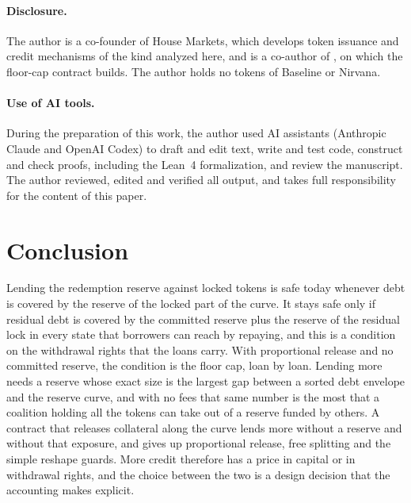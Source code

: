 \paragraph{Disclosure.} The author is a co-founder of House Markets, which develops token issuance and credit mechanisms of the kind analyzed here, and is a co-author of \vone, on which the floor-cap contract builds. The author holds no tokens of Baseline or Nirvana.

\paragraph{Use of AI tools.} During the preparation of this work, the author used AI assistants (Anthropic Claude and OpenAI Codex) to draft and edit text, write and test code, construct and check proofs, including the Lean~4 formalization, and review the manuscript. The author reviewed, edited and verified all output, and takes full responsibility for the content of this paper.

\section{Conclusion}

Lending the redemption reserve against locked tokens is safe today whenever debt is covered by the reserve of the locked part of the curve. It stays safe only if residual debt is covered by the committed reserve plus the reserve of the residual lock in every state that borrowers can reach by repaying, and this is a condition on the withdrawal rights that the loans carry. With proportional release and no committed reserve, the condition is the floor cap, loan by loan. Lending more needs a reserve whose exact size is the largest gap between a sorted debt envelope and the reserve curve, and with no fees that same number is the most that a coalition holding all the tokens can take out of a reserve funded by others. A contract that releases collateral along the curve lends more without a reserve and without that exposure, and gives up proportional release, free splitting and the simple reshape guards. More credit therefore has a price in capital or in withdrawal rights, and the choice between the two is a design decision that the accounting makes explicit.
